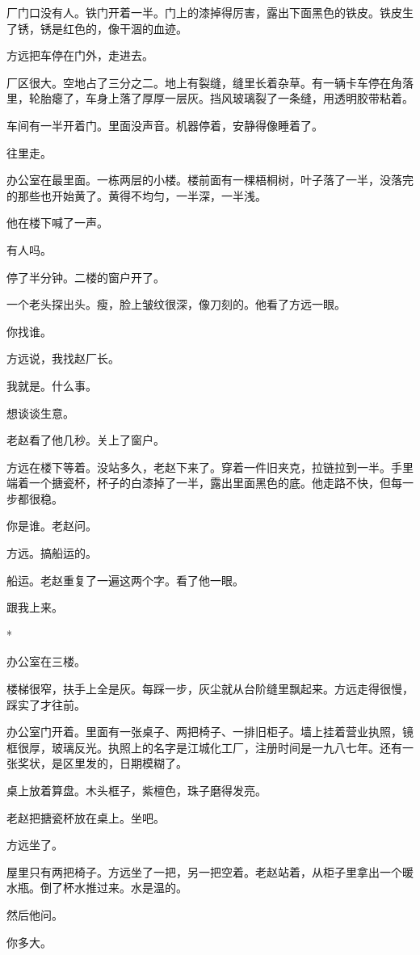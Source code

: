 \documentclass[UTF8,a5paper,11pt,openany]{ctexbook}
\newcommand{\scene}{\vspace{1em}\begin{center}*\quad*\quad*\end{center}\vspace{0.5em}}
\begin{document}
厂门口没有人。铁门开着一半。门上的漆掉得厉害，露出下面黑色的铁皮。铁皮生了锈，锈是红色的，像干涸的血迹。

方远把车停在门外，走进去。

厂区很大。空地占了三分之二。地上有裂缝，缝里长着杂草。有一辆卡车停在角落里，轮胎瘪了，车身上落了厚厚一层灰。挡风玻璃裂了一条缝，用透明胶带粘着。

车间有一半开着门。里面没声音。机器停着，安静得像睡着了。

往里走。

办公室在最里面。一栋两层的小楼。楼前面有一棵梧桐树，叶子落了一半，没落完的那些也开始黄了。黄得不均匀，一半深，一半浅。

他在楼下喊了一声。

有人吗。

停了半分钟。二楼的窗户开了。

一个老头探出头。瘦，脸上皱纹很深，像刀刻的。他看了方远一眼。

你找谁。

方远说，我找赵厂长。

我就是。什么事。

想谈谈生意。

老赵看了他几秒。关上了窗户。

方远在楼下等着。没站多久，老赵下来了。穿着一件旧夹克，拉链拉到一半。手里端着一个搪瓷杯，杯子的白漆掉了一半，露出里面黑色的底。他走路不快，但每一步都很稳。

你是谁。老赵问。

方远。搞船运的。

船运。老赵重复了一遍这两个字。看了他一眼。

跟我上来。


\scene

办公室在三楼。

楼梯很窄，扶手上全是灰。每踩一步，灰尘就从台阶缝里飘起来。方远走得很慢，踩实了才往前。

办公室门开着。里面有一张桌子、两把椅子、一排旧柜子。墙上挂着营业执照，镜框很厚，玻璃反光。执照上的名字是江城化工厂，注册时间是一九八七年。还有一张奖状，是区里发的，日期模糊了。

桌上放着算盘。木头框子，紫檀色，珠子磨得发亮。

老赵把搪瓷杯放在桌上。坐吧。

方远坐了。

屋里只有两把椅子。方远坐了一把，另一把空着。老赵站着，从柜子里拿出一个暖水瓶。倒了杯水推过来。水是温的。

然后他问。

你多大。
\end{document}
